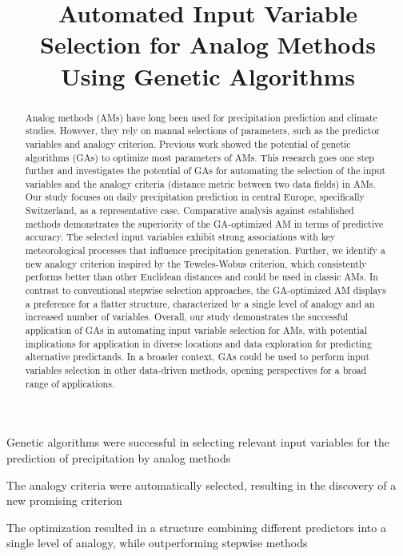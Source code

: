 \documentclass[draft]{agujournal2019}
\begin{document}
\title{Automated Input Variable Selection for Analog Methods Using Genetic Algorithms}





\begin{keypoints}
\item Genetic algorithms were successful in selecting relevant input variables for the prediction of precipitation by analog methods
\item The analogy criteria were automatically selected, resulting in the discovery of a new promising criterion
\item The optimization resulted in a structure combining different predictors into a single level of analogy, while outperforming stepwise methods
\end{keypoints}


\begin{abstract}

Analog methods (AMs) have long been used for precipitation prediction and climate studies. However, they rely on manual selections of parameters, such as the predictor variables and analogy criterion. Previous work showed the potential of genetic algorithms (GAs) to optimize most parameters of AMs. This research goes one step further and investigates the potential of GAs for automating the selection of the input variables and the analogy criteria (distance metric between two data fields) in AMs. Our study focuses on daily precipitation prediction in central Europe, specifically Switzerland, as a representative case.  
Comparative analysis against established methods demonstrates the superiority of the GA-optimized AM in terms of predictive accuracy. The selected input variables exhibit strong associations with key meteorological processes that influence precipitation generation. Further, we identify a new analogy criterion inspired by the Teweles-Wobus criterion, which consistently performs better than other Euclidean distances and could be used in classic AMs. In contrast to conventional stepwise selection approaches, the GA-optimized AM displays a preference for a flatter structure, characterized by a single level of analogy and an increased number of variables.
Overall, our study demonstrates the successful application of GAs in automating input variable selection for AMs, with potential implications for application in diverse locations and data exploration for predicting alternative predictands. In a broader context, GAs could be used to perform input variables selection in other data-driven methods, opening perspectives for a broad range of applications.


\end{abstract}
\end{document}
